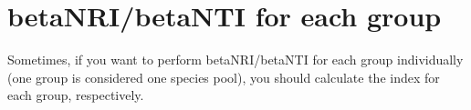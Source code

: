 \documentclass[
]{book}
\newenvironment{Shaded}{\begin{snugshade}}{\end{snugshade}}
\newcommand{\AttributeTok}[1]{\textcolor[rgb]{0.13,0.29,0.53}{#1}}
\newcommand{\FunctionTok}[1]{\textcolor[rgb]{0.13,0.29,0.53}{\textbf{#1}}}
\newcommand{\NormalTok}[1]{#1}
\newcommand{\SpecialCharTok}[1]{\textcolor[rgb]{0.81,0.36,0.00}{\textbf{#1}}}
\newcommand{\StringTok}[1]{\textcolor[rgb]{0.31,0.60,0.02}{#1}}
\begin{document}
\begin{Shaded}
\end{Shaded}

\section{betaNRI/betaNTI for each group}\label{betanribetanti-for-each-group}

Sometimes, if you want to perform betaNRI/betaNTI for each group individually (one group is considered one species pool),
you should calculate the index for each group, respectively.
\end{document}
